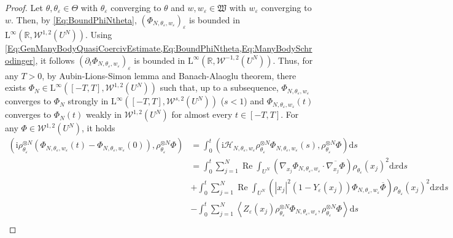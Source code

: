 \documentclass{article}
\def\W{\mathcal W}
\def\R{\mathbb R}
\def\L{\mathrm L}
\def\eps{\varepsilon}
\def \p {\partial}
\DeclareMathOperator{\re}{Re}
\def\d{\mathrm{d}}
\newtheorem{lemme}[theo]{Lemma}
\theoremstyle{definition}
\numberwithin{equation}{section}
\newcommand{\e}{\mathrm{e}} %
\newcommand{\complexI}{\mathrm{i}} %
\begin{document}

\begin{proof}

    Let $\theta,\theta_\eps\in\Theta$ with $\theta_\eps$ converging to $\theta$ and $w,w_\eps\in\mathfrak{W}$ with $w_\eps$ converging to $w$. Then, by \cref{Eq:BoundPhiNtheta}, $(\Phi_{N,\theta_\eps,w_\eps})_{\eps}$ is bounded in $\L^\infty(\R,\W^{1,2}(U^N))$. Using \cref{Eq:GenManyBodyQuasiCoercivEstimate,Eq:BoundPhiNtheta,Eq:ManyBodySchrodinger}, it follows $(\p_t\Phi_{N,\theta_\eps,w_\eps})_{\eps}$ is bounded in $\L^\infty(\R,\W^{-1,2}(U^N))$. Thus, for any $T>0$, by Aubin-Lions-Simon lemma \cite{SimonAubinLions} and Banach-Alaoglu theorem, there exists $\Phi_N\in\L^\infty([-T,T],\W^{1,2}(U^N))$ such that, up to a subsequence, $\Phi_{N,\theta_\eps,w_\eps}$ converges to $\Phi_N$ strongly in $\L^\infty([-T,T],\W^{s,2}(U^N))$ ($s<1$) and $\Phi_{N,\theta_\eps,w_\eps}(t)$ converges to $\Phi_N(t)$ weakly in $\W^{1,2}(U^N)$ for almost every $t\in[-T,T]$. For any $\Phi\in\W^{1,2}(U^N)$, it holds
    \begin{align*}
        \left(\complexI\rho^{\otimes N}_{\theta_\eps}\left(\Phi_{N,\theta_\eps,w_\eps}(t)-\Phi_{N,\theta_\eps,w_\eps}(0)\right),\rho_{\theta_\eps}^{\otimes N}\Phi\right) &= \int_0^t \left(\complexI\mathcal{H}_{N,\theta_\eps,w_\eps}\rho^{\otimes N}_{\theta_\eps}\Phi_{N,\theta_\eps,w_\eps}(s),\rho_{\theta_\eps}^{\otimes N}\Phi\right)\d s\\
        &= \int_0^t\sum_{j=1}^N \re\int_{U^N}\left(\nabla_{x_j}\Phi_{N,\theta_\eps,w_\eps}\cdot\overline{\nabla_{x_j}\Phi}\right)\rho_{\theta_\eps}(x_j)^2\d x\d s\\
        &+ \int_0^t\sum_{j=1}^N \re\int_{U^N}\left(|x_j|^2(1-Y_\eps(x_j))\Phi_{N,\theta_\eps,w_\eps}\overline{\Phi}\right)\rho_{\theta_\eps}(x_j)^2\d x\d s\\
        &- \int_0^t\sum_{j=1}^N \left\langle Z_{\eps}(x_j) \rho_{\theta_\eps}^{\otimes N}\Phi_{N,\theta_\eps,w_\eps}, \rho_{\theta_\eps}^{\otimes N}\Phi\right\rangle\d s\\

\end{align*}
\end{proof}
\end{document}
